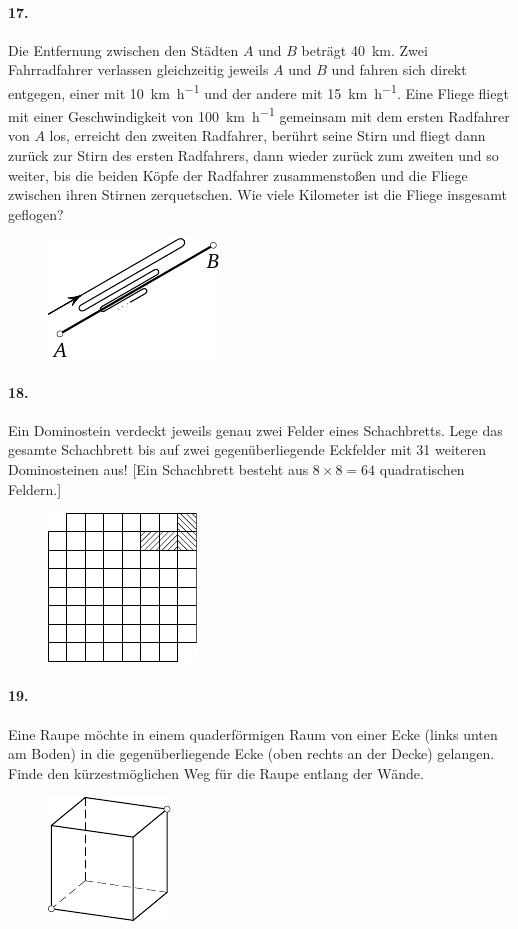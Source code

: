 \documentclass[10pt,a5paper,twoside]{article}
\newenvironment{problem}[1]{\paragraph*{#1}}{}
\begin{document}
\begin{problem}{17.}
	Die Entfernung zwischen den Städten $A$ und $B$ beträgt \SI{40}{\km}. Zwei Fahrradfahrer verlassen gleich\-zei\-tig jeweils $A$ und $B$ und fahren sich direkt entgegen, einer mit \SI{10}{\km\per\hour} und der andere mit \SI{15}{\km\per\hour}. Eine Fliege fliegt mit einer Geschwindigkeit von \SI{100}{\km\per\hour} gemeinsam mit dem ersten Radfahrer von $A$ los, er\-reicht den zweiten Radfahrer, berührt seine Stirn und fliegt dann zurück zur Stirn des ersten Radfahrers, dann wieder zurück zum zweiten und so weiter, bis die beiden Köpfe der Radfahrer zusammenstoßen und die Fliege zwischen ihren Stirnen zerquetschen. 
	Wie viele Kilometer ist die Fliege insgesamt geflogen? 
	\begin{figure}[H]
	\centering
	\includegraphics[scale=1]{taskbook-1}
	\end{figure}
\end{problem}

\begin{problem}{18.}
	Ein Dominostein verdeckt jeweils genau zwei Felder eines Schachbretts. Lege das gesamte Schachbrett bis auf zwei gegenüberliegende Eckfelder mit 31 weiteren Dominosteinen aus! [Ein Schachbrett besteht aus $8 \times 8 = 64$ quadratischen Feldern.]
	\begin{figure}[H]
	\centering
	\footnotesize
	\includegraphics[scale=1]{taskbook-2}
	\end{figure}
\end{problem}

\begin{problem}{19.}
	Eine Raupe möchte in einem quaderförmigen Raum von einer Ecke (links unten am Boden) in die gegenüberliegende Ecke (oben rechts an der Decke) gelangen. 
	Finde den kürzestmöglichen Weg für die Raupe entlang der Wände. 
	\begin{figure}[H]
	\centering
	\footnotesize
	\includegraphics[scale=1]{taskbook-3}
	\end{figure}
\end{problem}
\end{document}
